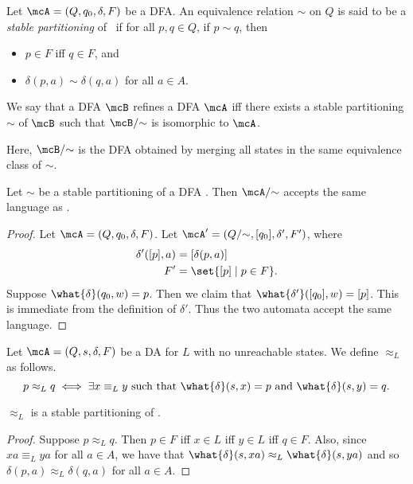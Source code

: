 \begin{definition} \label{def:stable_partitioning}
    Let $\mcA = (Q, q_0, \delta, F)$ be a DFA.
    An equivalence relation $\sim$ on $Q$ is said to be a
    \emph{stable partitioning} of \mcA\ if for all $p, q \in Q$,
    if $p \sim q$, then
    \begin{itemize}
        \item $p \in F$ iff $q \in F$, and
        \item $\delta(p, a) \sim \delta(q, a)$ for all $a \in A$.
    \end{itemize}
\end{definition}
\begin{definition} \label{def:dfa_refinement}
    We say that a DFA $\mcB$ refines a DFA $\mcA$ iff there exists a stable
    partitioning $\sim$ of $\mcB$ such that $\mcB/{\sim}$ is isomorphic to
    $\mcA$.
\end{definition}
Here, $\mcB/{\sim}$ is the DFA obtained by merging all states in the same
equivalence class of $\sim$.

\begin{proposition}
    Let $\sim$ be a stable partitioning of a DFA \mcA.
    Then $\mcA/{\sim}$ accepts the same language as \mcA.
\end{proposition}
\begin{proof}
    Let $\mcA = (Q, q_0, \delta, F)$.
    Let $\mcA' = (Q/{\sim}, [q_0], \delta', F')$, where \begin{align*}
        \delta'([p], a) &= [\delta(p, a)] \\
        F' &= \set{[p] \mid p \in F}.
    \end{align*}
    Suppose $\what{\delta}(q_0, w) = p$.
    Then we claim that $\what{\delta'}([q_0], w) = [p]$.
    This is immediate from the definition of $\delta'$.
    Thus the two automata accept the same language.
\end{proof}

\begin{definition}
    Let $\mcA = (Q, s, \delta, F)$ be a DA for $L$ with no unreachable
    states.
    We define $\approx_L$ as follows. \[
        p \approx_L q \iff \exists x \equiv_L y \text{ such that }
            \what{\delta}(s, x) = p \text{ and } \what{\delta}(s, y) = q.
    \]
\end{definition}
\begin{proposition}
    $\approx_L$ is a stable partitioning of \mcA.
\end{proposition}
\begin{proof}
    Suppose $p \approx_L q$.
    Then $p \in F$ iff $x \in L$ iff $y \in L$ iff $q \in F$.
    Also, since $xa \equiv_L ya$ for all $a \in A$, we have that
    $\what{\delta}(s, xa) \approx_L \what{\delta}(s, ya)$ and so
    $\delta(p, a) \approx_L \delta(q, a)$ for all $a \in A$.
\end{proof}

